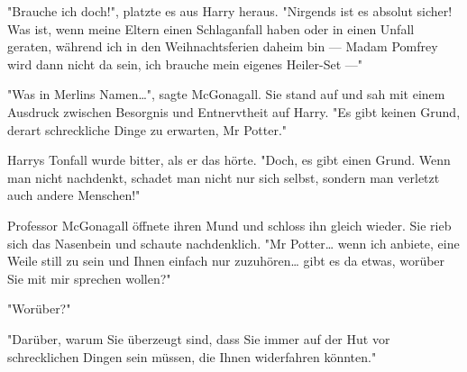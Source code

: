 {"Brauche ich doch!", platzte es aus Harry heraus. "Nirgends ist es absolut sicher! Was ist, wenn meine Eltern einen Schlaganfall haben oder in einen Unfall geraten, während ich in den Weihnachtsferien daheim bin --- Madam Pomfrey wird dann nicht da sein, ich brauche mein eigenes Heiler-Set ---"

"Was in Merlins Namen…", sagte McGonagall. Sie stand auf und sah mit einem Ausdruck zwischen Besorgnis und Entnervtheit auf Harry. "Es gibt keinen Grund, derart schreckliche Dinge zu erwarten, Mr Potter."

Harrys Tonfall wurde bitter, als er das hörte. "Doch, es gibt einen Grund. Wenn man nicht nachdenkt, schadet man nicht nur sich selbst, sondern man verletzt auch andere Menschen!"

Professor McGonagall öffnete ihren Mund und schloss ihn gleich wieder. Sie rieb sich das Nasenbein und schaute nachdenklich. "Mr Potter… wenn ich anbiete, eine Weile still zu sein und Ihnen einfach nur zuzuhören… gibt es da etwas, worüber Sie mit mir sprechen wollen?"

"Worüber?"

"Darüber, warum Sie überzeugt sind, dass Sie immer auf der Hut vor schrecklichen Dingen sein müssen, die Ihnen widerfahren könnten."

}
